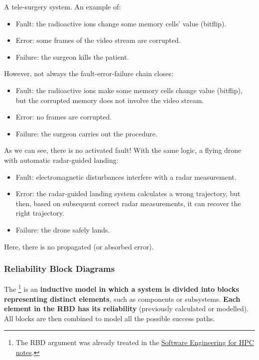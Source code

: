 \begin{examplebox}
    A tele-surgery system. An example of:
    \begin{itemize}
        \item Fault: the radioactive ions change some memory cells' value (bitflip).
        \item Error: some frames of the video stream are corrupted.
        \item Failure: the surgeon kills the patient.
    \end{itemize}
    However, not always the fault-error-failure chain closes:
    \begin{itemize}
        \item Fault: the radioactive ions make some memory cells change value (bitflip), but the corrupted memory does not involve the video stream.
        \item Error: no frames are corrupted.
        \item Failure: the surgeon carries out the procedure.
    \end{itemize}
    As we can see, there is no activated fault! With the same logic, a flying drone with automatic radar-guided landing:
    \begin{itemize}
        \item Fault: electromagnetic disturbances interfere with a radar measurement.
        \item Error: the radar-guided landing system calculates a wrong trajectory, but then, based on subsequent correct radar measurements, it can recover the right trajectory.
        \item Failure: the drone safely lands.
    \end{itemize}
    Here, there is no propagated (or absorbed error).
\end{examplebox}

\newpage

\subsubsection{Reliability Block Diagrams}

The \footnote{The RBD argument was already treated in the \href{https://github.com/PoliMI-HPC-E-notes-projects-AndreVale69/HPC-E-PoliMI-university-notes/tree/main/software-engineering-for-hpc}{Software Engineering for HPC notes}.} is an \textbf{inductive model in which a system is divided into blocks representing distinct elements}, such as components or subsystems. \textbf{Each element in the RBD has its reliability} (previously calculated or modelled). All blocks are then combined to model all the possible success paths.

